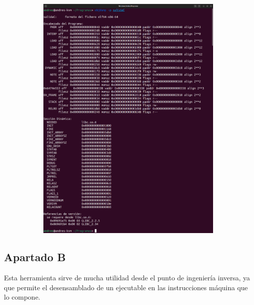\documentclass{article}
\begin{document}
\begin{itemize}
\begin{figure}[H]
\begin{subfigure}{0.49\textwidth}
            \includegraphics[width=\textwidth]{imagenes/mergedobjdumpp}
        \end{subfigure}
    \end{figure}    

\end{itemize}


\subsection*{Apartado B}

Esta herramienta sirve de mucha utilidad desde el punto de ingeniería inversa, ya que permite el desensamblado de un ejecutable en las instrucciones máquina que lo compone.
\end{document}
